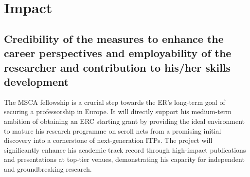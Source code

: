 \documentclass[12pt,draftproposal]{msca-pf}
\newcommand{\proj}{\small\textsc{ScrollNets}}
\newcommand{\TO}[1]{$\mathsf{TO#1}$}
\begin{document}

\section{Impact }
\label{sc:impact}

\subsection{Credibility of the measures to enhance the career perspectives
    and employability of the researcher and contribution to his/her skills
    development}
\label{ssc:impact:career}

The MSCA fellowship is a crucial step towards the ER's long-term goal of securing a professorship in
Europe. It will directly support his medium-term ambition of obtaining an ERC starting grant by
providing the ideal environment to mature his research programme on scroll nets from a promising
initial discovery into a cornerstone of next-generation ITPs. The project will significantly enhance
his academic track record through high-impact publications and presentations at top-tier venues,
demonstrating his capacity for independent and groundbreaking research.

\end{document}
